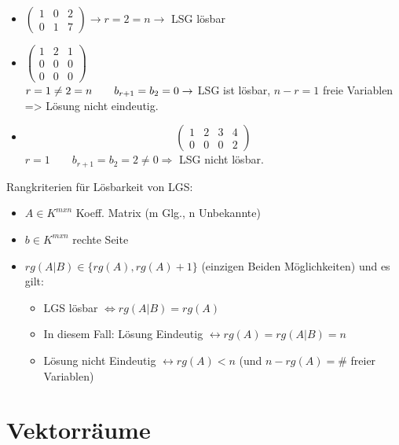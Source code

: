 \documentclass{scrartcl}
\begin{document}
\begin{Beispiel}
\begin{itemize}
\item 
$
\begin{pmatrix}
	1 & 0 & 2 \\ 
	0 & 1 & 7
\end{pmatrix}
	\rightarrow r = 2 = n \rightarrow
$ LSG lösbar

\item 
$
\begin{pmatrix}
	1 & 2 & 1 \\ 
	0 & 0 & 0 \\ 
	0 & 0 & 0
\end{pmatrix}  $\\
$ r = 1 \neq 2 = n \\\qquad b_{r+1} = b_2 = 0 \rightarrow $ LSG ist lösbar, $n - r = 1 $ freie Variablen => Lösung nicht eindeutig.

\item
\[
\left(\begin{array}{ccc|c}
	1 & 2 & 3 & 4 \\ 
	0 & 0 & 0 & 2
\end{array}\right)  \]
$ r = 1 \qquad b_{r+1} = b_2 = 2 \neq 0 \Rightarrow $ LSG nicht lösbar.

\end{itemize}
\end{Beispiel}

Rangkriterien für Lösbarkeit von LGS:
\begin{itemize}
	\item $A \in K^{mxn} $ Koeff. Matrix (m Glg., n Unbekannte)
	\item $b \in K^{mxn} $ rechte Seite
	\item $rg(A|B) \in \{rg(A), rg(A) + 1\} $ (einzigen Beiden Möglichkeiten)
	und es gilt:
	\begin{itemize}
	\item LGS lösbar $\Leftrightarrow rg(A|B) = rg(A)$
	\item In diesem Fall: Lösung Eindeutig $\leftrightarrow rg(A) = rg(A|B) = n$
	\item Lösung nicht Eindeutig $\leftrightarrow rg(A) < n$ (und $n-rg(A) = \# $ freier Variablen)
	\end{itemize}
\end{itemize}

\newpage
\section{Vektorräume}
\label{Vektorraum}
\end{document}
